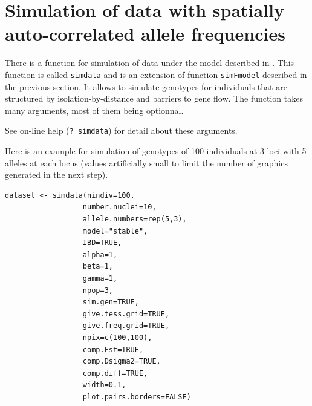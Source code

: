 \documentclass{article}
\begin{document}
\clearpage
\section[ Spatially correlated frequencies]{Simulation of data with spatially auto-correlated allele frequencies }\label{sim-IBD}

There is a function for simulation of data under the model described in \citep{Guillot09a}. 
This function is called {\tt simdata} and is an extension of function {\tt simFmodel} described in the previous section. It allows to simulate 
genotypes for individuals that are structured by isolation-by-distance and barriers to gene flow.
The function takes many arguments, most of them being optionnal. 


See on-line help ({\tt ? simdata}) for detail about these arguments.

Here is an example for simulation of genotypes of 100 individuals at 3 loci with 5 alleles at each locus 
(values artificially small to limit the number of graphics generated in the next step). 

\begin{verbatim}
dataset <- simdata(nindiv=100,
                  number.nuclei=10,
                  allele.numbers=rep(5,3),
                  model="stable",
                  IBD=TRUE,
                  alpha=1,
                  beta=1,
                  gamma=1,
                  npop=3,
                  sim.gen=TRUE,
                  give.tess.grid=TRUE,
                  give.freq.grid=TRUE,
                  npix=c(100,100),
                  comp.Fst=TRUE,
                  comp.Dsigma2=TRUE,
                  comp.diff=TRUE,
                  width=0.1,
                  plot.pairs.borders=FALSE)
\end{verbatim}
\end{document}
